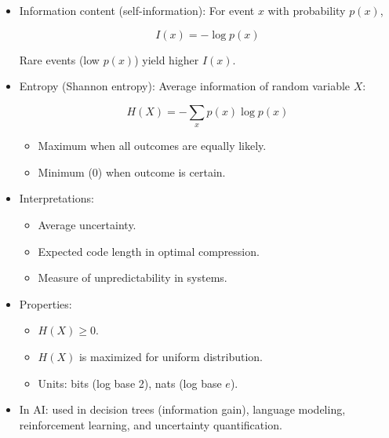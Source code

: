 \documentclass[
  letterpaper,
  DIV=11,
  numbers=noendperiod]{scrreprt}
\providecommand{\tightlist}{%
  \setlength{\itemsep}{0pt}\setlength{\parskip}{0pt}}
\begin{document}
\begin{itemize}
\item
  Information content (self-information): For event \(x\) with
  probability \(p(x)\),

  \[
  I(x) = -\log p(x)
  \]

  Rare events (low \(p(x)\)) yield higher \(I(x)\).
\item
  Entropy (Shannon entropy): Average information of random variable
  \(X\):

  \[
  H(X) = -\sum_x p(x)\log p(x)
  \]

  \begin{itemize}
  \tightlist
  \item
    Maximum when all outcomes are equally likely.
  \item
    Minimum (0) when outcome is certain.
  \end{itemize}
\item
  Interpretations:

  \begin{itemize}
  \tightlist
  \item
    Average uncertainty.
  \item
    Expected code length in optimal compression.
  \item
    Measure of unpredictability in systems.
  \end{itemize}
\item
  Properties:

  \begin{itemize}
  \tightlist
  \item
    \(H(X) \geq 0\).
  \item
    \(H(X)\) is maximized for uniform distribution.
  \item
    Units: bits (log base 2), nats (log base \(e\)).
  \end{itemize}
\item
  In AI: used in decision trees (information gain), language modeling,
  reinforcement learning, and uncertainty quantification.
\end{itemize}
\end{document}
